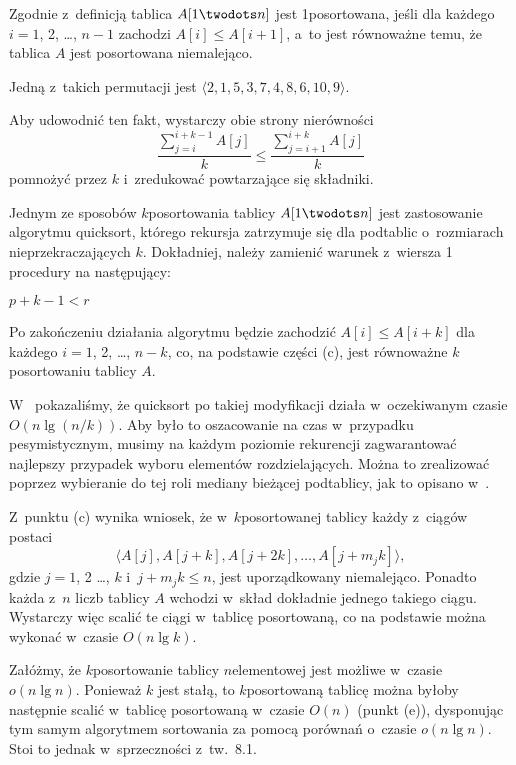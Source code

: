 
\subproblem %
Zgodnie z~definicją tablica $A[1\twodots n]$ jest 1\nbhyphen posortowana, jeśli dla każdego $i=1$, 2, \dots, $n-1$ zachodzi $A[i]\le A[i+1]$, a~to jest równoważne temu, że tablica $A$ jest posortowana niemalejąco.

\subproblem %
Jedną z~takich permutacji jest $\langle2,1,5,3,7,4,8,6,10,9\rangle$.

\subproblem %
Aby udowodnić ten fakt, wystarczy obie strony nierówności
\[
	\frac{\sum_{j=i}^{i+k-1}A[j]}{k} \le \frac{\sum_{j=i+1}^{i+k}A[j]}{k}
\]
pomnożyć przez $k$ i~zredukować powtarzające się składniki.

\subproblem %
Jednym ze sposobów $k$\nbhyphen posortowania tablicy $A[1\twodots n]$ jest zastosowanie algorytmu quicksort, którego rekursja zatrzymuje się dla podtablic o~rozmiarach nieprzekraczających $k$.
Dokładniej, należy zamienić warunek z~wiersza 1 procedury  na następujący:
\begin{codebox}
\li	\If $p+k-1<r$
\end{codebox}
Po zakończeniu działania algorytmu będzie zachodzić $A[i]\le A[i+k]$ dla każdego $i=1$, 2, \dots, $n-k$, co, na podstawie części (c), jest równoważne $k$\nbhyphen posortowaniu tablicy $A$.

W~ pokazaliśmy, że quicksort po takiej modyfikacji działa w~oczekiwanym czasie $O(n\lg(n/k))$.
Aby było to oszacowanie na czas w~przypadku pesymistycznym, musimy na każdym poziomie rekurencji zagwarantować najlepszy przypadek wyboru elementów rozdzielających.
Można to zrealizować poprzez wybieranie do tej roli mediany bieżącej podtablicy, jak to opisano w~.

\subproblem %
Z~punktu (c) wynika wniosek, że w~$k$\nbhyphen posortowanej tablicy każdy z~ciągów postaci
\[
    \langle A[j],A[j+k],A[j+2k],\dots,A[j+m_jk]\rangle,
\]
gdzie $j=1$, 2 \dots, $k$ i~$j+m_jk\le n$, jest uporządkowany niemalejąco.
Ponadto każda z~$n$ liczb tablicy $A$ wchodzi w~skład dokładnie jednego takiego ciągu.
Wystarczy więc scalić te ciągi w~tablicę posortowaną, co na podstawie  można wykonać w~czasie $O(n\lg k)$.

\subproblem %
Załóżmy, że $k$\nbhyphen posortowanie tablicy $n$\nbhyphen elementowej jest możliwe w~czasie $o(n\lg n)$.
Ponieważ $k$ jest stałą, to $k$\nbhyphen posortowaną tablicę można byłoby następnie scalić w~tablicę posortowaną w~czasie $O(n)$ (punkt (e)), dysponując tym samym algorytmem sortowania za pomocą porównań o~czasie $o(n\lg n)$.
Stoi to jednak w~sprzeczności z~tw.\ 8.1.
